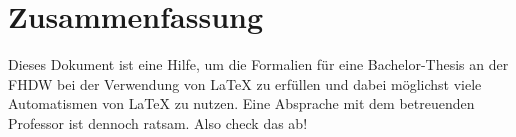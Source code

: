 \section{Zusammenfassung}

Dieses Dokument ist eine Hilfe, um die Formalien für eine Bachelor-Thesis an der
FHDW bei der Verwendung von {\LaTeX} zu erfüllen und dabei möglichst viele Automatismen von {\LaTeX} zu nutzen. Eine Absprache mit dem betreuenden Professor ist dennoch ratsam. Also check das ab!
